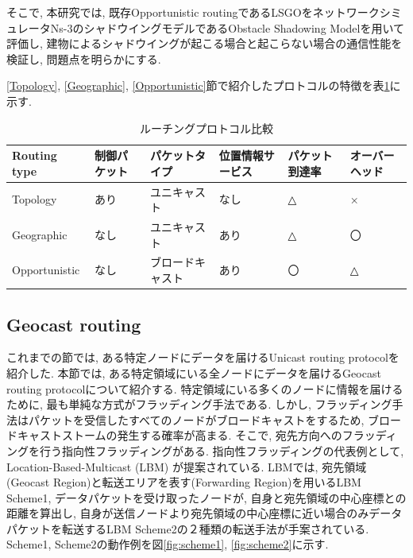 \documentclass[10pt]{jreport}
\begin{document}
そこで, 本研究では, 既存Opportunistic routingであるLSGOをネットワークシミュレータNs-3\cite{19}のシャドウイングモデルであるObstacle Shadowing Model\cite{20}を用いて評価し, 建物によるシャドウイングが起こる場合と起こらない場合の通信性能を検証し, 問題点を明らかにする.

\ref{Topology}, \ref{Geographic}, \ref{Opportunistic}節で紹介したプロトコルの特徴を表\ref{tab:protocol}に示す.

\begin{table}[h]
	\begin{center}
	\caption{ルーチングプロトコル比較}
	\label{tab:protocol}
	\centering
	\begin{tabular}{p{20mm}p{20mm}p{26mm}p{26mm}p{26mm}p{26mm}}
		\hline
		Routing type & 制御パケット & パケットタイプ & 位置情報サービス & パケット到達率 & オーバーヘッド \\
		\hline \hline
		Topology & あり & ユニキャスト & なし  & △ & × \\
		Geographic  & なし & ユニキャスト & あり   & △ & 〇 \\
		Opportunistic & なし & ブロードキャスト & あり   & 〇 & △ \\
		\hline
	\end{tabular}
	\end{center}
\end{table}





\subsection{Geocast routing}
これまでの節では, ある特定ノードにデータを届けるUnicast routing protocolを紹介した.
本節では, ある特定領域にいる全ノードにデータを届けるGeocast routing protocol\cite{Geocast}について紹介する.
特定領域にいる多くのノードに情報を届けるために, 最も単純な方式がフラッディング手法である.
しかし, フラッディング手法はパケットを受信したすべてのノードがブロードキャストをするため, ブロードキャストストームの発生する確率が高まる.
そこで, 宛先方向へのフラッディングを行う指向性フラッディングがある. 指向性フラッディングの代表例として, Location-Based-Multicast (LBM) \cite{LBM}が提案されている.
LBMでは, 宛先領域(Geocast Region)と転送エリアを表す(Forwarding Region)を用いるLBM Scheme1, データパケットを受け取ったノードが, 自身と宛先領域の中心座標との距離を算出し, 自身が送信ノードより宛先領域の中心座標に近い場合のみデータパケットを転送するLBM Scheme2の２種類の転送手法が手案されている.
Scheme1, Scheme2の動作例を図\ref{fig:scheme1}, \ref{fig:scheme2}に示す.
\end{document}
